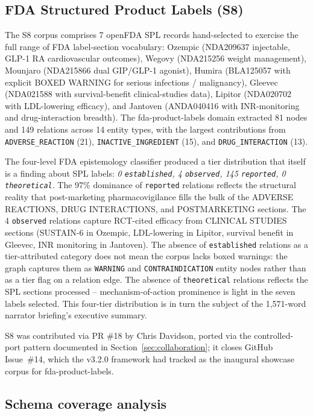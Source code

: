 \subsection{FDA Structured Product Labels (S8)}

The S8 corpus comprises 7 openFDA SPL records hand-selected to exercise the full range of FDA label-section vocabulary: Ozempic (NDA209637 injectable, GLP-1 RA cardiovascular outcomes), Wegovy (NDA215256 weight management), Mounjaro (NDA215866 dual GIP/GLP-1 agonist), Humira (BLA125057 with explicit BOXED WARNING for serious infections / malignancy), Gleevec (NDA021588 with survival-benefit clinical-studies data), Lipitor (NDA020702 with LDL-lowering efficacy), and Jantoven (ANDA040416 with INR-monitoring and drug-interaction breadth). The fda-product-labels domain extracted 81 nodes and 149 relations across 14 entity types, with the largest contributions from \texttt{ADVERSE\_REACTION} (21), \texttt{INACTIVE\_INGREDIENT} (15), and \texttt{DRUG\_INTERACTION} (13).

The four-level FDA epistemology classifier produced a tier distribution that itself is a finding about SPL labels: \emph{0 \texttt{established}, 4 \texttt{observed}, 145 \texttt{reported}, 0 \texttt{theoretical}}. The 97\% dominance of \texttt{reported} relations reflects the structural reality that post-marketing pharmacovigilance fills the bulk of the ADVERSE REACTIONS, DRUG INTERACTIONS, and POSTMARKETING sections. The 4 \texttt{observed} relations capture RCT-cited efficacy from CLINICAL STUDIES sections (SUSTAIN-6 in Ozempic, LDL-lowering in Lipitor, survival benefit in Gleevec, INR monitoring in Jantoven). The absence of \texttt{established} relations as a tier-attributed category does not mean the corpus lacks boxed warnings: the graph captures them as \texttt{WARNING} and \texttt{CONTRAINDICATION} entity nodes rather than as a tier flag on a relation edge. The absence of \texttt{theoretical} relations reflects the SPL sections processed -- mechanism-of-action prominence is light in the seven labels selected. This four-tier distribution is in turn the subject of the 1{,}571-word narrator briefing's executive summary.

S8 was contributed via PR \#18 by Chris Davidson, ported via the controlled-port pattern documented in Section~\ref{sec:collaboration}; it closes GitHub Issue~\#14, which the v3.2.0 framework had tracked as the inaugural showcase corpus for fda-product-labels.

\subsection{Schema coverage analysis}

